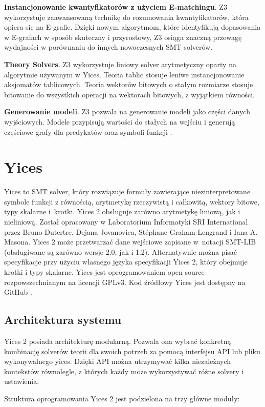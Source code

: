 \textbf{Instancjonowanie kwantyfikatorów z użyciem E-matchingu}. Z3 wykorzystuje zaawansowaną technikę do rozumowania kwantyfikatorów, która opiera się na E-grafie. Dzięki nowym algorytmom, które identyfikują dopasowania w E-grafach w sposób skuteczny i przyrostowy, Z3 osiąga znaczną przewagę wydajności w porównaniu do innych nowoczesnych SMT solverów. 

\textbf{Theory Solvers}. Z3 wykorzystuje liniowy solver arytmetyczny oparty na algorytmie używanym w Yices. Teoria tablic stosuje leniwe instancjonowanie aksjomatów tablicowych. Teoria wektorów bitowych o stałym rozmiarze stosuje bitowanie do wszystkich operacji na wektorach bitowych, z wyjątkiem równości.

\textbf{Generowanie modeli}. Z3 pozwala na generowanie modeli jako części danych wyjściowych. Modele przypisują wartości do stałych na wejściu i generują częściowe grafy dla predykatów oraz symboli funkcji \cite{demoura08z}.


\section{Yices}
Yices to SMT solver, który rozwiązuje formuły zawierające niezinterpretowane symbole funkcji z równością, arytmetykę rzeczywistą i całkowitą, wektory bitowe, typy skalarne i~krotki. Yices 2 obsługuje zarówno arytmetykę liniową, jak i nieliniową.
Został opracowany w Laboratorium Informatyki SRI International przez Bruno Dutertre, Dejana Jovanovica, Stéphane Graham-Lengrand i Iana A. Masona.
Yices 2 może przetwarzać dane wejściowe zapisane w~notacji SMT-LIB (obsługiwane są zarówno wersje 2.0, jak i 1.2). Alternatywnie można pisać specyfikacje przy użyciu własnego języka specyfikacji Yices 2, który obejmuje krotki i typy skalarne. 
Yices jest oprogramowaniem open source rozpowszechnianym na licencji GPLv3. Kod źródłowy Yices jest dostępny na GitHub \cite{yices2.2}.

\subsection{Architektura systemu}
Yices 2 posiada architekturę modularną. Pozwala ona wybrać konkretną kombinację solverów teorii dla swoich potrzeb za pomocą interfejsu API lub pliku wykonywalnego yices. Dzięki API można utrzymywać kilka niezależnych kontekstów równolegle, z których każdy może wykorzystywać różne solvery i ustawienia.

Struktura oprogramowania Yices 2 jest podzielona na trzy główne moduły:

